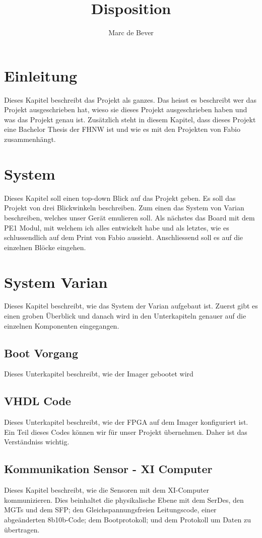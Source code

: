 \documentclass{article}
\title{Disposition}
\author{Marc de Bever}
\begin{document}
\maketitle
\section{Einleitung}
Dieses Kapitel beschreibt das Projekt als ganzes. Das heisst es beschreibt wer das Projekt ausgeschrieben hat, wieso sie dieses Projekt ausgeschrieben haben und was das Projekt genau ist. Zusätzlich steht in diesem Kapitel, dass dieses Projekt eine Bachelor Thesis der FHNW ist und wie es mit den Projekten von Fabio zusammenhängt.

\section{System}
Dieses Kapitel soll einen top-down Blick auf das Projekt geben. Es soll das Projekt von drei Blickwinkeln beschreiben. Zum einen das System von Varian beschreiben, welches unser Gerät emulieren soll. Als nächstes das Board mit dem PE1 Modul, mit welchem ich alles entwickelt habe und als letztes, wie es schlussendlich auf dem Print von Fabio aussieht. Anschliessend soll es auf die einzelnen Blöcke eingehen.

\section{System Varian}
Dieses Kapitel beschreibt, wie das System der Varian aufgebaut ist. Zuerst gibt es einen groben Überblick und danach wird in den Unterkapiteln genauer auf die einzelnen Komponenten eingegangen.
\subsection{Boot Vorgang}
Dieses Unterkapitel beschreibt, wie der Imager gebootet wird
\subsection{VHDL Code}
Dieses Unterkapitel beschreibt, wie der FPGA auf dem Imager konfiguriert ist. Ein Teil dieses Codes können wir für unser Projekt übernehmen. Daher ist das Verständniss wichtig.
\subsection{Kommunikation Sensor - XI Computer}
Dieses Kapitel beschreibt, wie die Sensoren mit dem XI-Computer kommunizieren. Dies beinhaltet die physikalische Ebene mit dem SerDes, den MGTs und dem SFP; den Gleichspannungsfreien Leitungscode, einer abgeänderten 8b10b-Code; dem Bootprotokoll; und dem Protokoll um Daten zu übertragen.
\end{document}
